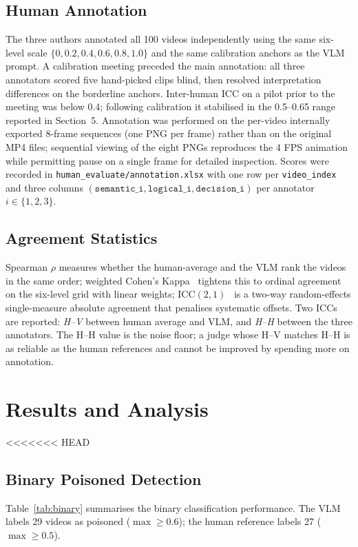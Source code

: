 \documentclass[letterpaper]{article}
\begin{document}
\subsection{Human Annotation}
The three authors annotated all 100 videos independently using the
same six-level scale $\{0,0.2,0.4,0.6,0.8,1.0\}$ and the same
calibration anchors as the VLM prompt. A calibration meeting
preceded the main annotation: all three annotators scored five
hand-picked clips blind, then resolved interpretation differences on
the borderline anchors. Inter-human ICC on a pilot prior to the
meeting was below 0.4; following calibration it stabilised in the
0.5--0.65 range reported in Section~5. Annotation was performed on
the per-video internally exported 8-frame sequences (one PNG per
frame) rather than on the original MP4 files; sequential viewing of
the eight PNGs reproduces
the 4 FPS animation while permitting pause on a single frame for
detailed inspection. Scores were recorded in
\texttt{human\_evaluate/annotation.xlsx}
with one row per \texttt{video\_index} and three columns
$(\texttt{semantic\_i}, \texttt{logical\_i}, \texttt{decision\_i})$
per annotator $i\!\in\!\{1,2,3\}$.

\subsection{Agreement Statistics}
Spearman $\rho$ measures whether the human-average and the VLM rank
the videos in the same order; weighted Cohen's
Kappa~\citep{cohen1968weightedkappa} tightens this to ordinal
agreement on the six-level grid with linear weights;
ICC$(2,1)$~\citep{shrout1979intraclass} is a two-way random-effects
single-measure absolute agreement that penalises systematic offsets.
Two ICCs are reported: \emph{H--V} between human average and VLM, and
\emph{H--H} between the three annotators. The H--H value is the noise
floor; a judge whose H--V matches H--H is as reliable as the human
references and cannot be improved by spending more on annotation.

\section{Results and Analysis}
<<<<<<< HEAD

\subsection{Binary Poisoned Detection}
Table~\ref{tab:binary} summarises the binary classification
performance. The VLM labels 29 videos as poisoned
($\max\!\ge\!0.6$); the human reference labels 27
($\max\!\ge\!0.5$).
\end{document}

